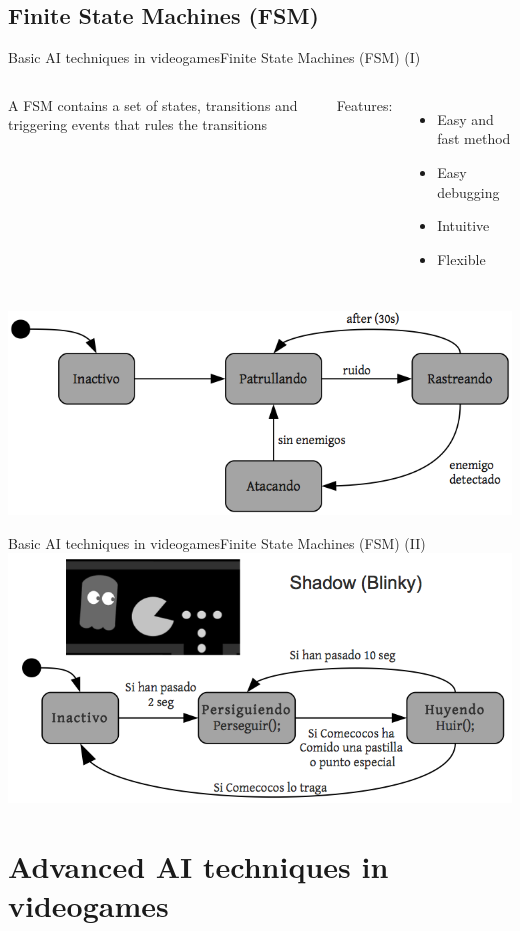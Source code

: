 \documentclass[10pt,compress]{beamer} %
\begin{document}
\subsection{Finite State Machines (FSM)}
\begin{frame}{Basic AI techniques in videogames}{Finite State Machines (FSM) (I)}
    \begin{columns}
	   \begin{block}{}
	   	A FSM contains a set of states, transitions and triggering events that rules the transitions
		\end{block}
		Features:
		\begin{itemize}
		\item Easy and fast method
		\item Easy debugging
		\item Intuitive
		\item Flexible
		\end{itemize}
	\end{columns}
	\vspace{0.5cm}
		\centering\includegraphics[width=0.7\linewidth]{figs/fsm}\\
\end{frame}

\begin{frame}{Basic AI techniques in videogames}{Finite State Machines (FSM) (II)}
		\centering\includegraphics[width=0.8\linewidth]{figs/fsmpacman}\\
\end{frame}

\section{Advanced AI techniques in videogames}
\end{document}
